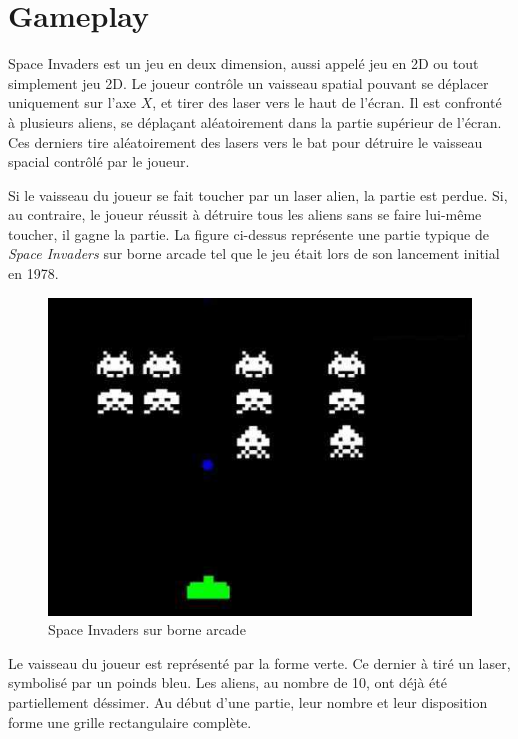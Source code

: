 \documentclass[french]{nakrule}
\begin{document}
\clearpage
\symmetricalPage

\section{Gameplay}
\label{sec:gameplay}

Space Invaders est un jeu en deux dimension, aussi appelé jeu en 2D ou tout
simplement jeu 2D. Le joueur contrôle un vaisseau spatial pouvant se déplacer
uniquement sur l'axe $X$, et tirer des laser vers le haut de l'écran. Il est
confronté à plusieurs aliens, se déplaçant aléatoirement dans la partie
supérieur de l'écran. Ces derniers tire aléatoirement des lasers vers le bat
pour détruire le vaisseau spacial contrôlé par le joueur.

Si le vaisseau du joueur se fait toucher par un laser alien, la partie est
perdue. Si, au contraire, le joueur réussit à détruire tous les aliens sans se
faire lui-même toucher, il gagne la partie. La figure ci-dessus représente une
partie typique de \emph{Space Invaders} sur borne arcade tel que le jeu était
lors de son lancement initial en 1978.

\begin{figure}[ht]
  \centering
  \includegraphics[width=.6\textwidth]{pictures/gameOnArcade}
  \caption{Space Invaders sur borne arcade}
  \label{gameOnArcade}
\end{figure}

Le vaisseau du joueur est représenté par la forme verte. Ce dernier à tiré un
laser, symbolisé par un poinds bleu. Les aliens, au nombre de 10, ont déjà été
partiellement déssimer. Au début d'une partie, leur nombre et leur disposition
forme une grille rectangulaire complète.

\end{document}
